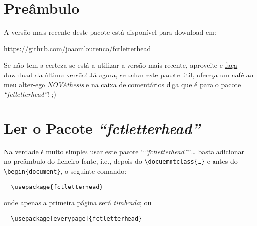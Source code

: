 \documentclass[a4paper,11pt]{article}
\title{\theTitle}
\author{\theAuthor}
\newcommand*{\thePackage}{\emph{“fctletterhead”}}
\begin{document}
\maketitle

\thispagestyle{empty}%

\begin{abstract}
    Este documento é simultaneamente um manual de instruções e um exemplo de como usar o pacote “\thePackage”.  Este pacote permite produzir documentos em \emph{papel letterhead} da FCT-NOVA.
\end{abstract}


\section{Preâmbulo}

A versão mais recente deste pacote está disponível para download em:

\begin{center}
  \url{https://github.com/joaomlourenco/fctletterhead}
\end{center}

Se não tem a certeza se está a utilizar a versão mais recente, aproveite e \href{https://github.com/joaomlourenco/fctletterhead/archive/refs/heads/main.zip}{faça download} da última versão!   Já agora, se achar este pacote útil, \href{https://www.paypal.com/donate/?hosted_button_id=8WA8FRVMB78W8}{ofereça um café} ao meu alter-ego \emph{NOVAthesis} e na caixa de comentários diga que é para o pacote \thePackage! ;)


\section{Ler o Pacote \thePackage}

Na verdade é muito simples usar este pacote “\thePackage”…  basta adicionar no preâmbulo do ficheiro fonte, i.e., depois do \verb!\docuemntclass{…}! e antes do \verb!\begin{document}!, o seguinte comando:

\begin{verbatim}
  \usepackage{fctletterhead}
\end{verbatim}

\noindent onde apenas a primeira página será \emph{timbrada}; ou

\begin{verbatim}
  \usepackage[everypage]{fctletterhead}
\end{verbatim}
\end{document}
